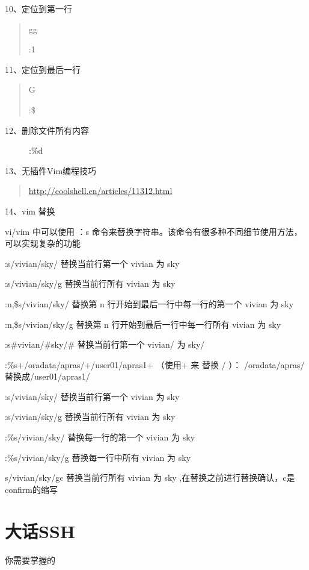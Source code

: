 \documentclass[letterpaper,10pt]{sphinxmanual}
\begin{document}
10、定位到第一行
\begin{quote}

gg

:1
\end{quote}

11、定位到最后一行
\begin{quote}

G

:\$
\end{quote}
\begin{description}
\item[{12、删除文件所有内容}] \leavevmode
:\%d

\end{description}

13、无插件Vim编程技巧
\begin{quote}

\href{http://coolshell.cn/articles/11312.html}{http://coolshell.cn/articles/11312.html}
\end{quote}

14、vim 替换

vi/vim 中可以使用 ：s 命令来替换字符串。该命令有很多种不同细节使用方法，可以实现复杂的功能

:s/vivian/sky/ 替换当前行第一个 vivian 为 sky

:s/vivian/sky/g 替换当前行所有 vivian 为 sky

:n,\$s/vivian/sky/ 替换第 n 行开始到最后一行中每一行的第一个 vivian 为 sky

:n,\$s/vivian/sky/g 替换第 n 行开始到最后一行中每一行所有 vivian 为 sky

:s\#vivian/\#sky/\# 替换当前行第一个 vivian/ 为 sky/

:\%s+/oradata/apras/+/user01/apras1+ （使用+ 来 替换 / ）： /oradata/apras/替换成/user01/apras1/

:s/vivian/sky/ 替换当前行第一个 vivian 为 sky

:s/vivian/sky/g 替换当前行所有 vivian 为 sky

:\%s/vivian/sky/ 替换每一行的第一个 vivian 为 sky

:\%s/vivian/sky/g  替换每一行中所有 vivian 为 sky

s/vivian/sky/gc  替换当前行所有 vivian 为 sky ,在替换之前进行替换确认，c是confirm的缩写


\section{大话SSH}
\label{Linux_ssh/index::doc}\label{Linux_ssh/index:ssh}
你需要掌握的
\end{document}
